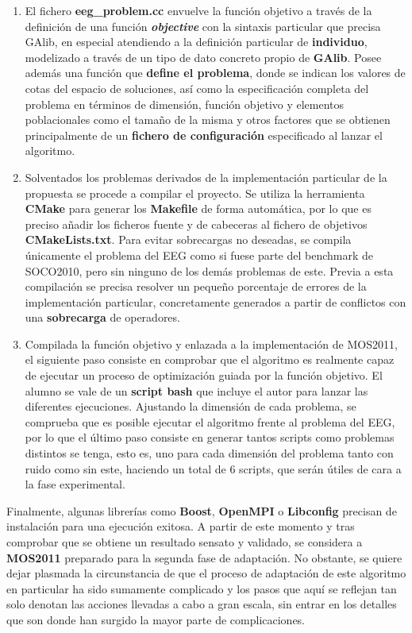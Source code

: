 \begin{enumerate}
\begin{enumerate}
		\item El fichero \textbf{eeg\_problem.cc} envuelve la función objetivo a través de la definición de una función \textbf{\textit{objective}} con la sintaxis particular que precisa GAlib, en especial atendiendo a la definición particular de \textbf{individuo}, modelizado a través de un tipo de dato concreto propio de \textbf{GAlib}. Posee además una función que \textbf{define el problema}, donde se indican los valores de cotas del espacio de soluciones, así como la especificación completa del problema en términos de dimensión, función objetivo y elementos poblacionales como el tamaño de la misma y otros factores que se obtienen principalmente de un \textbf{fichero de configuración} especificado al lanzar el algoritmo.
		
		\item Solventados los problemas derivados de la implementación particular de la propuesta se procede a compilar el proyecto. Se utiliza la herramienta \textbf{CMake} para generar los \textbf{Makefile} de forma automática, por lo que es preciso añadir los ficheros fuente y de cabeceras al fichero de objetivos \textbf{CMakeLists.txt}. Para evitar sobrecargas no deseadas, se compila únicamente el problema del EEG como si fuese parte del benchmark de SOCO2010, pero sin ninguno de los demás problemas de este. Previa a esta compilación se precisa resolver un pequeño porcentaje de errores de la implementación particular, concretamente generados a partir de conflictos con una \textbf{sobrecarga} de operadores.
		
		\item Compilada la función objetivo y enlazada a la implementación de MOS2011, el siguiente paso consiste en comprobar que el algoritmo es realmente capaz de ejecutar un proceso de optimización guiada por la función objetivo. El alumno se vale de un \textbf{script bash} que incluye el autor para lanzar las diferentes ejecuciones. Ajustando la dimensión de cada problema, se comprueba que es posible ejecutar el algoritmo frente al problema del EEG, por lo que el último paso consiste en generar tantos scripts como problemas distintos se tenga, esto es, uno para cada dimensión del problema tanto con ruido como sin este, haciendo un total de 6 scripts, que serán útiles de cara a la fase experimental.
	\end{enumerate}
	
	Finalmente, algunas librerías como \textbf{Boost}, \textbf{OpenMPI} o \textbf{Libconfig} precisan de instalación para una ejecución exitosa. A partir de este momento y tras comprobar que se obtiene un resultado sensato y validado, se considera a \textbf{MOS2011} preparado para la segunda fase de adaptación. No obstante, se quiere dejar plasmada la circunstancia de que el proceso de adaptación de este algoritmo en particular ha sido sumamente complicado y los pasos que aquí se reflejan tan solo denotan las acciones llevadas a cabo a gran escala, sin entrar en los detalles que son donde han surgido la mayor parte de complicaciones.
	

\end{enumerate}
